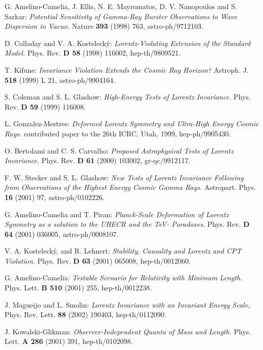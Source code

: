 \documentclass[a4paper,12pt]{article}
\begin{document}
\begin{thebibliography}{999}

 G. Amelino-Camelia, J. Ellis, N. E. Mayromatos, D. V. Nanopoulos and S. Sarkar:
{\it Potential Sensitivity of Gamma-Ray Burster Observations to Wave Dispersion in Vacuo.}
Nature {\bf 393} (1998) 763, astro-ph/9712103.

  D. Colladay and V. A. Kosteleck\'y:
{\it Lorentz-Violating Extension of the Standard Model.}
Phys. Rev. {\bf D 58} (1998) 116002, hep-th/9809521.

 T. Kifune:
{\it Invariance Violation Extends the Cosmic Ray Horizon?}
Astroph. J. {\bf 518} (1999) L 21, astro-ph/9904164.

 S. Coleman and S. L. Glashow:
{\it High-Energy Tests of Lorentz Invariance.}
Phys. Rev. {\bf D 59} (1999) 116008.

 L. Gonzalez-Mestres:
{\it Deformed Lorentz Symmetry and Ultra-High Energy Cosmic Rays.}
contributed paper to the 26th ICRC, Utah, 1999, hep-ph/9905430.

 O. Bertolami and C. S. Carvalho:
{\it Proposed Astrophysical Tests of Lorentz Invariance.}
Phys. Rev. {\bf D 61} (2000) 103002, gr-qc/9912117.

 F. W. Stecker and S. L. Glashow:
{\it New Tests of Lorentz Invariance Following from Observations of the Highest Energy Cosmic Gamma Rays.}
Astropart. Phys. {\bf 16} (2001) 97, astro-ph/0102226.

 G. Amelino-Camelia and T. Piran:
{\it Planck-Scale Deformation of Lorentz Symmetry as a solution to the UHECR and the TeV-\myHighlight{$\gamma$}\coordHE{} Paradoxes.}
Phys. Rev. {\bf D 64} (2001) 036005, astro-ph/0008107.

 V. A. Kosteleck\'y, and R. Lehnert:
{\it Stability, Causality and Lorentz and CPT Violation.}
Phys. Rev. {\bf D 63} (2001) 065008, hep-th/0012060.

 G. Amelino-Camelia:
{\it Testable Scenario for Relativity with Minimum Length.}
Phys. Lett. {\bf B 510} (2001) 255, hep-th/0012238.

 J. Magueijo and L. Smolin:
{\it Lorentz Invariance with an Invariant Energy Scale,}
Phys. Rev. Lett. {\bf 88} (2002) 190403, hep-th/0112090.

 J. Kowalski-Glikman:
{\it Observer-Independent Quanta of Mass and Length.}
Phys. Lett. {\bf A 286} (2001) 391, hep-th/0102098.


\end{thebibliography}
\end{document}

